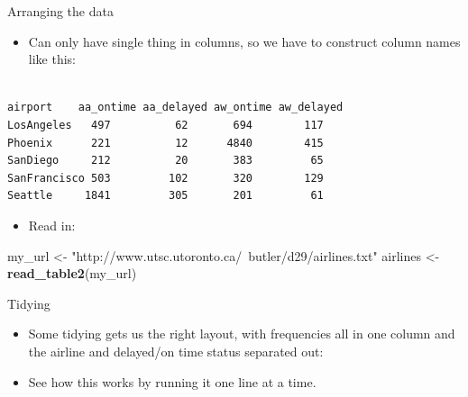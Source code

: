 \documentclass[ignorenonframetext,]{beamer}
\newenvironment{Shaded}{\begin{snugshade}}{\end{snugshade}}
\newcommand{\KeywordTok}[1]{\textcolor[rgb]{0.13,0.29,0.53}{\textbf{#1}}}
\newcommand{\NormalTok}[1]{#1}
\newcommand{\OperatorTok}[1]{\textcolor[rgb]{0.81,0.36,0.00}{\textbf{#1}}}
\newcommand{\StringTok}[1]{\textcolor[rgb]{0.31,0.60,0.02}{#1}}
\providecommand{\tightlist}{%
  \setlength{\itemsep}{0pt}\setlength{\parskip}{0pt}}
\begin{document}
\begin{frame}[fragile]{Arranging the data}
\protect\hypertarget{arranging-the-data}{}

\begin{itemize}
\tightlist
\item
  Can only have single thing in columns, so we have to construct column
  names like this: \small
\end{itemize}

\begin{verbatim}

airport    aa_ontime aa_delayed aw_ontime aw_delayed
LosAngeles   497          62       694        117
Phoenix      221          12      4840        415
SanDiego     212          20       383         65
SanFrancisco 503         102       320        129
Seattle     1841         305       201         61
\end{verbatim}

\normalsize

\begin{itemize}
\tightlist
\item
  Read in:
\end{itemize}

\begin{Shaded}
\begin{Highlighting}[]
\NormalTok{my_url <-}\StringTok{ "http://www.utsc.utoronto.ca/~butler/d29/airlines.txt"}
\NormalTok{airlines <-}\StringTok{ }\KeywordTok{read_table2}\NormalTok{(my_url)}
\end{Highlighting}
\end{Shaded}

\end{frame}

\begin{frame}[fragile]{Tidying}
\protect\hypertarget{tidying-1}{}

\begin{itemize}
\tightlist
\item
  Some tidying gets us the right layout, with frequencies all in one
  column and the airline and delayed/on time status separated out:
\end{itemize}

\begin{Shaded}
\end{Shaded}

\begin{itemize}
\tightlist
\item
  See how this works by running it one line at a time.
\end{itemize}

\end{frame}
\end{document}
